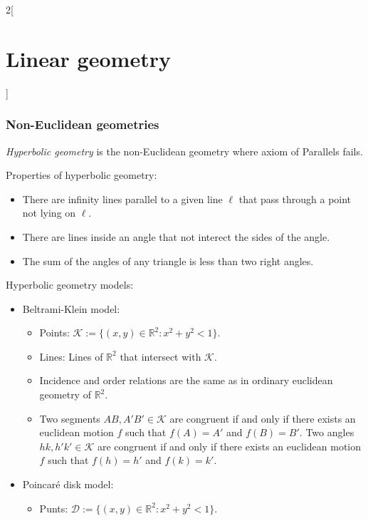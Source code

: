 \documentclass[class=article,10pt,crop=false]{standalone}
\begin{document}
\begin{multicols}{2}[\section{Linear geometry}]
\subsubsection{Non-Euclidean geometries}
\begin{definition}
\textit{Hyperbolic geometry} is the non-Euclidean geometry where axiom of Parallels fails.
\end{definition}
\begin{prop}
Properties of hyperbolic geometry:
\begin{itemize}
    \item There are infinity lines parallel to a given line $\ell$ that pass through a point not lying on $\ell$.
    \item There are lines inside an angle that not interect the sides of the angle.
    \item The sum of the angles of any triangle is less than two right angles.
\end{itemize}
\end{prop}
\begin{definition}
Hyperbolic geometry models:
\begin{itemize}
    \item Beltrami-Klein model:
    \begin{itemize}
        \item Points: $\mathcal{K}:=\{(x,y)\in\mathbb{R}^2:x^2+y^2<1\}$.
        \item Lines: Lines of $\mathbb{R}^2$ that intersect with $\mathcal{K}$.
        \item Incidence and order relations are the same as in ordinary euclidean geometry of $\mathbb{R}^2$.
        \item Two segments $AB,A'B'\in\mathcal{K}$ are congruent if and only if there exists an euclidean motion $f$ such that $f(A)=A'$ and $f(B)=B'$. Two angles $hk,h'k'\in\mathcal{K}$ are congruent if and only if there exists an euclidean motion $f$ such that $f(h)=h'$ and $f(k)=k'$.
    \end{itemize}
    \begin{figure}[ht] 
        \centering 
    \end{figure} 
    \item Poincaré disk model:
    \begin{itemize}
        \item Punts: $\mathcal{D}:=\{(x,y)\in\mathbb{R}^2:x^2+y^2<1\}$.

\end{itemize}
\end{itemize}
\end{definition}
\end{multicols}
\end{document}

